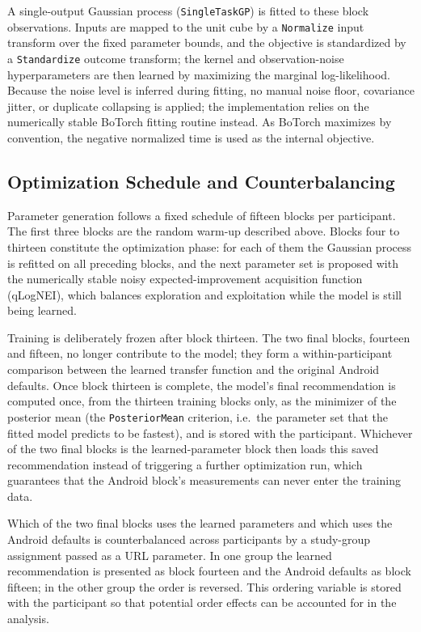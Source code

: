 A single-output Gaussian process (\texttt{SingleTaskGP}) is fitted to these block observations. Inputs are mapped to the unit cube by a \texttt{Normalize} input transform over the fixed parameter bounds, and the objective is standardized by a \texttt{Standardize} outcome transform; the kernel and observation-noise hyperparameters are then learned by maximizing the marginal log-likelihood. Because the noise level is inferred during fitting, no manual noise floor, covariance jitter, or duplicate collapsing is applied; the implementation relies on the numerically stable BoTorch fitting routine instead. As BoTorch maximizes by convention, the negative normalized time is used as the internal objective.

\subsection{Optimization Schedule and Counterbalancing}

Parameter generation follows a fixed schedule of fifteen blocks per participant. The first three blocks are the random warm-up described above. Blocks four to thirteen constitute the optimization phase: for each of them the Gaussian process is refitted on all preceding blocks, and the next parameter set is proposed with the numerically stable noisy expected-improvement acquisition function (qLogNEI), which balances exploration and exploitation while the model is still being learned.

Training is deliberately frozen after block thirteen. The two final blocks, fourteen and fifteen, no longer contribute to the model; they form a within-participant comparison between the learned transfer function and the original Android defaults. Once block thirteen is complete, the model's final recommendation is computed once, from the thirteen training blocks only, as the minimizer of the posterior mean (the \texttt{PosteriorMean} criterion, i.e.\ the parameter set that the fitted model predicts to be fastest), and is stored with the participant. Whichever of the two final blocks is the learned-parameter block then loads this saved recommendation instead of triggering a further optimization run, which guarantees that the Android block's measurements can never enter the training data.

Which of the two final blocks uses the learned parameters and which uses the Android defaults is counterbalanced across participants by a study-group assignment passed as a URL parameter. In one group the learned recommendation is presented as block fourteen and the Android defaults as block fifteen; in the other group the order is reversed. This ordering variable is stored with the participant so that potential order effects can be accounted for in the analysis.

